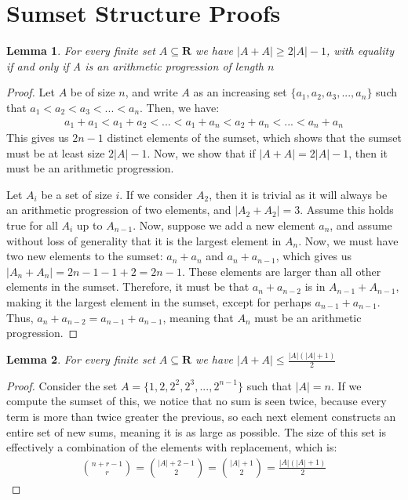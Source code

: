\documentclass{article}
\newtheorem{lemma}{Lemma}
\begin{document}
\section{Sumset Structure Proofs}
\label{sec:sumset}

\begin{lemma}
\label{Arithmetic Progression}
For every finite set $A \subseteq \mathbf{R}$ we have $|A+A| \geq 2|A|-1$, with equality if and only if A is an arithmetic progression of length $n$
\end{lemma}

\begin{proof}
Let $A$ be of size $n$, and write $A$ as an increasing set $\{a_1, a_2, a_3, ..., a_n\}$ such that $a_1 < a_2 < a_3 < ... < a_n$. Then, we have:
\begin{align*}
    a_1 + a_1 < a_1 + a_2 < ... < a_1 + a_n < a_2 + a_n < ... < a_n + a_n
\end{align*}
This gives us $2n-1$ distinct elements of the sumset, which shows that the sumset must be at least size $2|A|-1$. Now, we show that if $|A+A| = 2|A|-1$, then it must be an arithmetic progression. 

Let $A_i$ be a set of size $i$. If we consider $A_2$, then it is trivial as it will always be an arithmetic progression of two elements, and $|A_2 + A_2| = 3$. Assume this holds true for all $A_i$ up to $A_{n-1}$. Now, suppose we add a new element $a_n$, and assume without loss of generality that it is the largest element in $A_n$. Now, we must have two new elements to the sumset: $a_n + a_n$ and $a_n + a_{n-1}$, which gives us $|A_n + A_n| = 2{n-1}-1 + 2 = 2n-1$. These elements are larger than all other elements in the sumset. Therefore, it must be that $a_n + a_{n-2}$ is in $A_{n-1} + A_{n-1}$, making it the largest element in the sumset, except for perhaps $a_{n-1} + a_{n-1}$. Thus, $a_n + a_{n-2} = a_{n-1} + a_{n-1}$, meaning that $A_{n}$ must be an arithmetic progression.
\end{proof}

\begin{lemma}
\label{Largest sumset}
For every finite set $A \subseteq \mathbf{R}$ we have $|A+A| \leq \frac{|A|(|A| + 1)}{2}$
\end{lemma}

\begin{proof}
Consider the set $A = \{1,2,2^2,2^3,...,2^{n-1}\}$ such that $|A| = n$. If we compute the sumset of this, we notice that no sum is seen twice, because every term is more than twice greater the previous, so each next element constructs an entire set of new sums, meaning it is as large as possible. The size of this set is effectively a combination of the elements with replacement, which is:
\begin{align*}
    \binom{n+r-1}{r} = \binom{|A|+2-1}{2} = \binom{|A|+1}{2} = \frac{|A|(|A| + 1)}{2}
\end{align*}
\end{proof}
\end{document}
